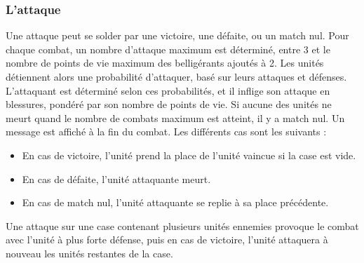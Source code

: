 \newpage
\subsubsection{L'attaque}

Une attaque peut se solder par une victoire, une défaite, ou un match nul.
\newline
Pour chaque combat, un nombre d'attaque maximum est déterminé, entre 3 et le nombre de points de vie maximum des belligérants ajoutés à 2.
\newline
\newline
Les unités détiennent alors une probabilité d'attaquer, basé sur leurs attaques et défenses.
\newline
 L'attaquant est déterminé selon ces probabilités, et il inflige son attaque en blessures, pondéré par son nombre de points de vie.
\newline
Si aucune des unités ne meurt quand le nombre de combats maximum est atteint, il y a match nul.
\newline
\newline
Un message est affiché à la fin du combat.
\newline
 Les différents cas sont les suivants :
\begin{itemize}
\item En cas de victoire, l'unité prend la place de l'unité vaincue si la case est vide.
\item En cas de défaite, l'unité attaquante meurt.
\item En cas de match nul, l'unité attaquante se replie à sa place précédente.
\newline
\end{itemize}
Une attaque sur une case contenant plusieurs unités ennemies provoque le combat avec l'unité à plus forte défense, puis en cas de victoire, l'unité attaquera à nouveau les unités restantes de la case.


